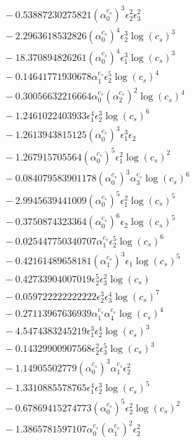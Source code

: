 \documentclass[10pt]{article}
\begin{document}
\begin{align*}
&{}  - 0.53887230275821 \left(\alpha_{0}^{c_s}\right)^{3} \epsilon_{2}^{2} \epsilon_{3}^{2} \\
&{}  - 2.2963618532826 \left(\alpha_{0}^{c_s}\right)^{4} \epsilon_{2}^{3} \log{\left(c_{s} \right)}^{3} \\
&{}  - 18.370894826261 \left(\alpha_{0}^{c_s}\right)^{4} \epsilon_{1}^{3} \log{\left(c_{s} \right)}^{3} \\
&{}  - 0.14641771930678 \alpha_{1}^{c_s} \epsilon_{2}^{5} \log{\left(c_{s} \right)}^{4} \\
&{}  - 0.30056632216664 \alpha_{0}^{c_s} \left(\alpha_{2}^{c_s}\right)^{2} \log{\left(c_{s} \right)}^{4} \\
&{}  - 1.2461022403933 \epsilon_{1}^{4} \epsilon_{2}^{3} \log{\left(c_{s} \right)}^{6} \\
&{}  - 1.2613943815125 \left(\alpha_{0}^{c_s}\right)^{3} \epsilon_{1}^{3} \epsilon_{2} \\
&{}  - 1.267915705564 \left(\alpha_{0}^{c_s}\right)^{5} \epsilon_{1}^{2} \log{\left(c_{s} \right)}^{2} \\
&{}  - 0.084079583901178 \left(\alpha_{0}^{c_s}\right)^{3} \alpha_{3}^{c_s} \log{\left(c_{s} \right)}^{6} \\
&{}  - 2.9945639441009 \left(\alpha_{0}^{c_s}\right)^{5} \epsilon_{1}^{2} \log{\left(c_{s} \right)}^{5} \\
&{}  - 0.3750874323364 \left(\alpha_{0}^{c_s}\right)^{6} \epsilon_{2} \log{\left(c_{s} \right)}^{5} \\
&{}  - 0.025447750340707 \alpha_{1}^{c_s} \epsilon_{2}^{5} \log{\left(c_{s} \right)}^{6} \\
&{}  - 0.42161489658181 \left(\alpha_{1}^{c_s}\right)^{3} \epsilon_{1} \log{\left(c_{s} \right)}^{5} \\
&{}  - 0.42733904007019 \epsilon_{2}^{5} \epsilon_{3}^{2} \log{\left(c_{s} \right)} \\
&{}  - 0.059722222222222 \epsilon_{2}^{3} \epsilon_{3}^{4} \log{\left(c_{s} \right)}^{7} \\
&{}  - 0.27113967636939 \alpha_{1}^{c_s} \alpha_{4}^{c_s} \log{\left(c_{s} \right)}^{4} \\
&{}  - 4.5474383245219 \epsilon_{1}^{3} \epsilon_{2}^{4} \log{\left(c_{s} \right)}^{3} \\
&{}  - 0.14329900907568 \epsilon_{2}^{2} \epsilon_{3}^{5} \log{\left(c_{s} \right)}^{3} \\
&{}  - 1.14905502779 \left(\alpha_{0}^{c_s}\right)^{3} \alpha_{1}^{c_s} \epsilon_{2}^{2} \\
&{}  - 1.3310885578765 \epsilon_{1}^{4} \epsilon_{2}^{3} \log{\left(c_{s} \right)}^{5} \\
&{}  - 0.67869415274773 \left(\alpha_{0}^{c_s}\right)^{5} \epsilon_{2}^{2} \log{\left(c_{s} \right)}^{2} \\
&{}  - 1.3865781597107 \alpha_{0}^{c_s} \left(\alpha_{1}^{c_s}\right)^{2} \epsilon_{2}^{2}
\end{align*}
\end{document}
